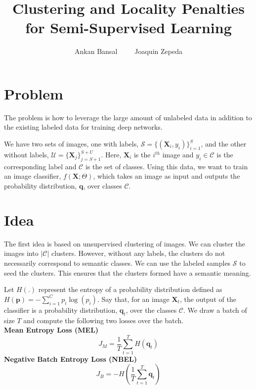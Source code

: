 \documentclass[runningheads]{llncs}
\begin{document}
%
\title{Clustering and Locality Penalties for Semi-Supervised Learning} 

%
\author{Ankan Bansal~~~~~Joaquin Zepeda}

%
\maketitle              %

\section{Problem}
The problem is how to leverage the large amount of unlabeled data in addition
to the existing labeled data for training deep networks. 

We have two sets of images, one with labels, $\mathcal{S} = \{(\mathbf{X}_i, y_i)\}_{i=1}^S$, and 
the other without labels, $\mathcal{U} = \{\mathbf{X}_j\}_{j=S+1}^{S+U}$. Here, $\mathbf{X}_i$ is the
$i^{th}$ image and $y_i \in \mathcal{C}$ is the corresponding label and $\mathcal{C}$ is the set of
classes.  Using this data, we want to train an image classifier, $f(\mathbf{X}; \Theta)$,
which takes an image as input and outputs the probability distribution, $\mathbf{q}$, over classes
$\mathcal{C}$.


\section{Idea}
The first idea is based on unsupervised clustering of images. We can cluster the images into
$|\mathcal{C}|$ clusters. However, without any labels, the clusters do not necessarily
correspond to semantic classes. We can use the labeled samples $\mathcal{S}$ to seed the clusters.
This ensures that the clusters formed have a semantic meaning.

Let $H(.)$ represent the entropy of a probability distribution defined as $H(\mathbf{p}) =
-\sum_{i=1}^{C}p_i \log(p_i)$.  Say that, for an image $\mathbf{X}_t$, the output of the classifier
is a probability distribution, $\mathbf{q}_t$, over the classes $\mathcal{C}$. We draw a batch of
size $T$ and compute the following two losses over the batch.\\
\textbf{Mean Entropy Loss (MEL)}
\begin{equation}
	J_M = \frac{1}{T}\sum_{t=1}^{T}H(\mathbf{q}_t)
\end{equation}
\textbf{Negative Batch Entropy Loss (NBEL)}
\begin{equation}
	J_B = -H(\frac{1}{T}\sum_{t=1}^{T}\mathbf{q}_t)
\end{equation}
\end{document}
